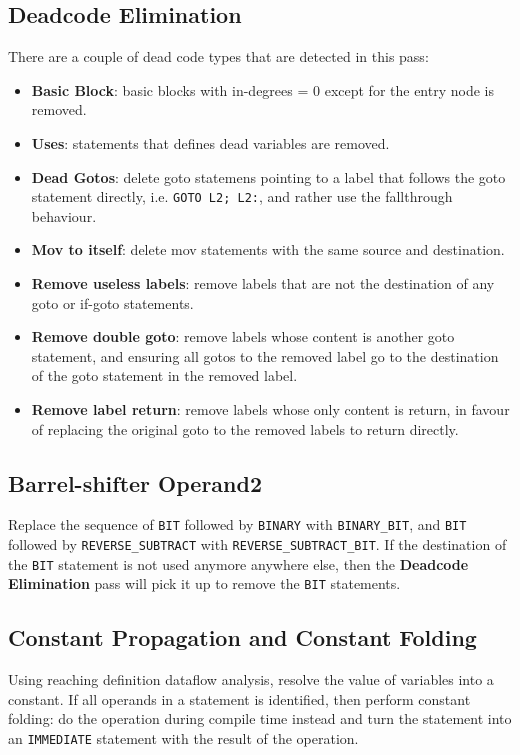 \documentclass[nonacm, acmsmall, screen, 10pt]{acmart}
\begin{document}
\subsection{Deadcode Elimination}
There are a couple of dead code types that are detected in this pass:
\begin{itemize}
  \item \textbf{Basic Block}: basic blocks with in-degrees = 0 except for the entry node is removed.
  \item \textbf{Uses}: statements that defines dead variables are removed.
  \item \textbf{Dead Gotos}: delete goto statemens pointing to a label that follows the goto statement directly, i.e. \texttt{GOTO L2; L2:}, and rather use the fallthrough behaviour.
  \item \textbf{Mov to itself}: delete mov statements with the same source and destination.
  \item \textbf{Remove useless labels}: remove labels that are not the destination of any goto or if-goto statements.
  \item \textbf{Remove double goto}: remove labels whose content is another goto statement, and ensuring all gotos to the removed label go to the destination of the goto statement in the removed label.
  \item \textbf{Remove label return}: remove labels whose only content is return, in favour of replacing the original goto to the removed labels to return directly.
\end{itemize}

\subsection{Barrel-shifter Operand2}
Replace the sequence of \texttt{BIT} followed by \texttt{BINARY} with \texttt{BINARY\_BIT}, and \texttt{BIT} followed by \texttt{REVERSE\_SUBTRACT} with \texttt{REVERSE\_SUBTRACT\_BIT}.
If the destination of the \texttt{BIT} statement is not used anymore anywhere else, then the \textbf{Deadcode Elimination} pass will pick it up to remove the \texttt{BIT} statements.

\subsection{Constant Propagation and Constant Folding}
Using reaching definition dataflow analysis, resolve the value of variables into a constant.
If all operands in a statement is identified, then perform constant folding: do the operation during compile time instead and turn the statement into an \texttt{IMMEDIATE} statement with the result of the operation.
\end{document}
